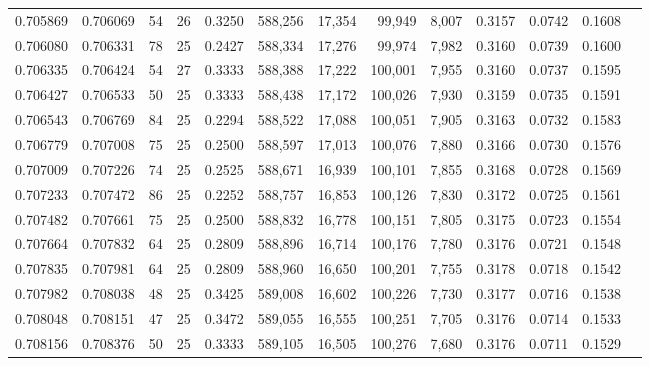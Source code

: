 \begin{tabular}{rrrrrrrrrrrrr}
0.705869 & 0.706069 &  54 &  26 &                                     0.3250 & 588,256 &  17,354 &  99,949 &   8,007 & 0.3157 & 0.0742 & 0.1608 \\
0.706080 & 0.706331 &  78 &  25 &                                     0.2427 & 588,334 &  17,276 &  99,974 &   7,982 & 0.3160 & 0.0739 & 0.1600 \\
0.706335 & 0.706424 &  54 &  27 &                                     0.3333 & 588,388 &  17,222 & 100,001 &   7,955 & 0.3160 & 0.0737 & 0.1595 \\
0.706427 & 0.706533 &  50 &  25 &                                     0.3333 & 588,438 &  17,172 & 100,026 &   7,930 & 0.3159 & 0.0735 & 0.1591 \\
0.706543 & 0.706769 &  84 &  25 &                                     0.2294 & 588,522 &  17,088 & 100,051 &   7,905 & 0.3163 & 0.0732 & 0.1583 \\
0.706779 & 0.707008 &  75 &  25 &                                     0.2500 & 588,597 &  17,013 & 100,076 &   7,880 & 0.3166 & 0.0730 & 0.1576 \\
0.707009 & 0.707226 &  74 &  25 &                                     0.2525 & 588,671 &  16,939 & 100,101 &   7,855 & 0.3168 & 0.0728 & 0.1569 \\
0.707233 & 0.707472 &  86 &  25 &                                     0.2252 & 588,757 &  16,853 & 100,126 &   7,830 & 0.3172 & 0.0725 & 0.1561 \\
0.707482 & 0.707661 &  75 &  25 &                                     0.2500 & 588,832 &  16,778 & 100,151 &   7,805 & 0.3175 & 0.0723 & 0.1554 \\
0.707664 & 0.707832 &  64 &  25 &                                     0.2809 & 588,896 &  16,714 & 100,176 &   7,780 & 0.3176 & 0.0721 & 0.1548 \\
0.707835 & 0.707981 &  64 &  25 &                                     0.2809 & 588,960 &  16,650 & 100,201 &   7,755 & 0.3178 & 0.0718 & 0.1542 \\
0.707982 & 0.708038 &  48 &  25 &                                     0.3425 & 589,008 &  16,602 & 100,226 &   7,730 & 0.3177 & 0.0716 & 0.1538 \\
0.708048 & 0.708151 &  47 &  25 &                                     0.3472 & 589,055 &  16,555 & 100,251 &   7,705 & 0.3176 & 0.0714 & 0.1533 \\
0.708156 & 0.708376 &  50 &  25 &                                     0.3333 & 589,105 &  16,505 & 100,276 &   7,680 & 0.3176 & 0.0711 & 0.1529 \\

\end{tabular}
